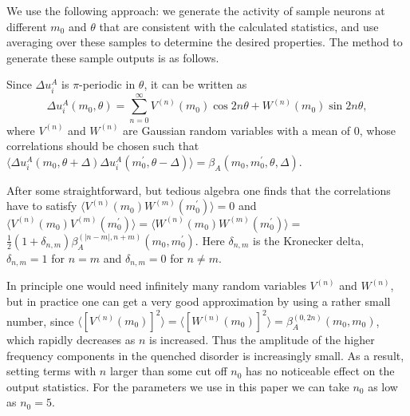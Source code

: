 We use the following approach: we generate the activity of sample neurons 
at different $m_0$ and $\theta$ that are consistent with the calculated 
statistics, and use averaging over these samples to determine the desired 
properties. The method to generate these sample outputs is as follows.

Since $\Delta u_i^{A}$ is $\pi$-periodic in $\theta$, it can be
written as
\begin{equation}
\Delta u_i^{A}(m_0,\theta)=\sum_{n=0}^\infty V^{(n)}(m_0)\cos 2n\theta+
W^{(n)}(m_0)\sin 2n\theta,
\end{equation}
where $V^{(n)}$ and $W^{(n)}$ are Gaussian random variables with a mean of 0,
whose correlations should be chosen such that 
$\langle \Delta u_i^{A}(m_0,\theta+\Delta)
\Delta u_i^{A}(m_0^\prime,\theta-\Delta)\rangle=
\beta_A(m_0,m_0^\prime,\theta,\Delta)$\@. 

After some straightforward, but tedious algebra one finds that
the correlations have to satisfy 
$\langle V^{(n)}(m_0)W^{(m)}(m_0^\prime)\rangle=0$ and
$\langle V^{(n)}(m_0)V^{(m)}(m_0^\prime)\rangle=
 \langle W^{(n)}(m_0)W^{(m)}(m_0^\prime)\rangle=$\\$
\frac{1}{2}(1+\delta_{n,m})\beta_{A}^{(|n-m|,n+m)}(m_0,m_0^\prime)$\@.
Here $\delta_{n,m}$ is the Kronecker delta, $\delta_{n,m}=1$ for $n=m$ and
$\delta_{n,m}=0$ for $n\neq m$\@.

In principle one would need infinitely many random variables $V^{(n)}$ and 
$W^{(n)}$, but in practice one can get a very good approximation by using a 
rather small number, since $\langle [V^{(n)}(m_0)]^2\rangle=
\langle [W^{(n)}(m_0)]^2\rangle=\beta_{A}^{(0,2n)}(m_0,m_0)$, which rapidly 
decreases as $n$ is increased. Thus the 
amplitude of the higher frequency components in the quenched disorder is 
increasingly small. As a result, setting terms with $n$ larger than some cut 
off $n_0$ has no noticeable effect on the output statistics.
For the parameters we use in this paper we can take $n_0$ as low as $n_0=5$\@.

